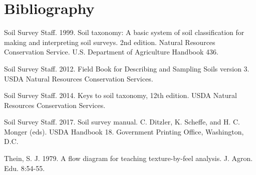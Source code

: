\documentclass[letterpaper, 12pt]{article}
\begin{document}




\section*{Bibliography}

Soil Survey Staff. 1999. Soil taxonomy: A basic system of soil classification for making and interpreting soil surveys. 2nd edition. Natural Resources Conservation Service. U.S. Department of Agriculture Handbook 436.

Soil Survey Staff. 2012. Field Book for Describing and Sampling Soils version 3.  USDA Natural Resources Conservation Services.

Soil Survey Staff. 2014. Keys to soil taxonomy, 12th edition. USDA Natural Resources Conservation Services.

Soil Survey Staff. 2017. Soil survey manual. C. Ditzler, K. Scheffe, and H. C. Monger (eds). USDA Handbook 18. Government Printing Office, Washington, D.C.

Thein, S. J. 1979. A flow diagram for teaching texture-by-feel analysis. J. Agron. Edu. 8:54-55.
\end{document}
